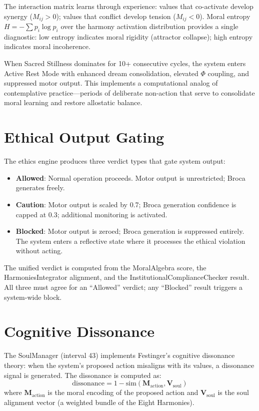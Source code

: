 \documentclass[12pt]{book}
\begin{document}
The interaction matrix learns through experience: values that co-activate develop synergy ($M_{ij} > 0$); values that conflict develop tension ($M_{ij} < 0$). Moral entropy $H = -\sum p_i \log p_i$ over the harmony activation distribution provides a single diagnostic: low entropy indicates moral rigidity (attractor collapse); high entropy indicates moral incoherence.

When Sacred Stillness dominates for 10+ consecutive cycles, the system enters Active Rest Mode with enhanced dream consolidation, elevated $\Phi$ coupling, and suppressed motor output. This implements a computational analog of contemplative practice---periods of deliberate non-action that serve to consolidate moral learning and restore allostatic balance.

\section{Ethical Output Gating}

The ethics engine produces three verdict types that gate system output:

\begin{itemize}
  \item \textbf{Allowed}: Normal operation proceeds. Motor output is unrestricted; Broca generates freely.
  \item \textbf{Caution}: Motor output is scaled by 0.7; Broca generation confidence is capped at 0.3; additional monitoring is activated.
  \item \textbf{Blocked}: Motor output is zeroed; Broca generation is suppressed entirely. The system enters a reflective state where it processes the ethical violation without acting.
\end{itemize}

The unified verdict is computed from the MoralAlgebra score, the HarmoniesIntegrator alignment, and the InstitutionalComplianceChecker result. All three must agree for an ``Allowed'' verdict; any ``Blocked'' result triggers a system-wide block.

\section{Cognitive Dissonance}

The SoulManager (interval 43) implements Festinger's cognitive dissonance theory: when the system's proposed action misaligns with its values, a dissonance signal is generated. The dissonance is computed as:
\begin{equation}
\text{dissonance} = 1 - \text{sim}(\mathbf{M}_{\text{action}}, \mathbf{V}_{\text{soul}})
\end{equation}
where $\mathbf{M}_{\text{action}}$ is the moral encoding of the proposed action and $\mathbf{V}_{\text{soul}}$ is the soul alignment vector (a weighted bundle of the Eight Harmonies).
\end{document}
